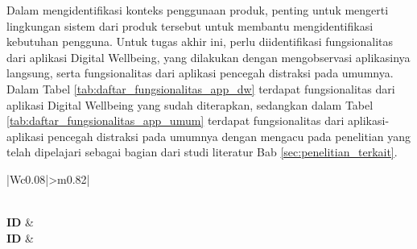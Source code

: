 Dalam mengidentifikasi konteks penggunaan produk, penting untuk mengerti lingkungan sistem dari produk tersebut untuk membantu mengidentifikasi kebutuhan pengguna. Untuk tugas akhir ini, perlu diidentifikasi fungsionalitas dari aplikasi Digital Wellbeing, yang dilakukan dengan mengobservasi aplikasinya langsung, serta fungsionalitas dari aplikasi pencegah distraksi pada umumnya. Dalam Tabel \ref{tab:daftar_fungsionalitas_app_dw} terdapat fungsionalitas dari aplikasi Digital Wellbeing yang sudah diterapkan, sedangkan dalam Tabel \ref{tab:daftar_fungsionalitas_app_umum} terdapat fungsionalitas dari aplikasi-aplikasi pencegah distraksi pada umumnya dengan mengacu pada penelitian yang telah dipelajari sebagai bagian dari studi literatur Bab \ref{sec:penelitian_terkait}.

\RaggedLeft
\begin{footnotesize}
\begin{longtable}[c]{|W{c}{0.08\textwidth}|>{\ccnormspacing}m{0.82\textwidth}|}
  \caption{Daftar Fungsionalitas Aplikasi Digital Wellbeing}
  \label{tab:daftar_fungsionalitas_app_dw} \\
  \hline {} \textbf{ID} &  \\ \hline \endfirsthead
  \hline {} \textbf{ID} &  \\ \hline \endhead
  
  \hline \endfoot
  

\end{longtable}
\end{footnotesize}
